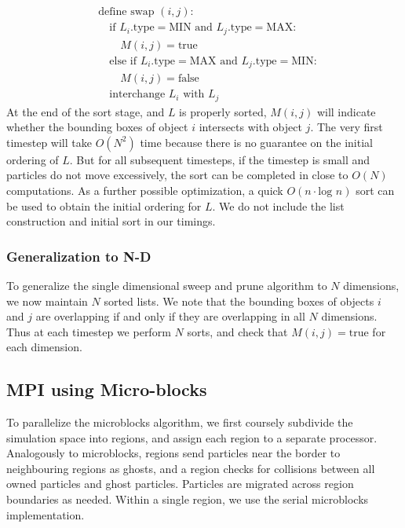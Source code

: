 \documentclass[11pt]{article} %
\begin{document}
\[
\begin{aligned} & \text{define swap }(i,j):\\
 & \quad\text{if }L_{i}\text{.type}=\text{MIN and }L_{j}\text{.type}=\text{MAX}:\\
 & \quad\quad M(i,j)=\text{true}\\
 & \quad\text{else if }L_{i}\text{.type}=\text{MAX and }L_{j}\text{.type}=\text{MIN}:\\
 & \quad\quad M(i,j)=\text{false}\\
 & \quad\text{interchange }L_{i}\text{ with }L_{j}
\end{aligned}
\]
At the end of the sort stage, and $L$ is properly sorted, $M(i,j)$
will indicate whether the bounding boxes of object $i$ intersects
with object $j$. The very first timestep will take $O(N^{2})$ time
because there is no guarantee on the initial ordering of $L$. But
for all subsequent timesteps, if the timestep is small and particles
do not move excessively, the sort can be completed in close to $O(N)$
computations. As a further possible optimization, a quick $O(n\cdot\text{log }n)$
sort can be used to obtain the initial ordering for $L$. We do not include the list construction and initial sort in our timings.

\subsubsection{Generalization to N-D}

To generalize the single dimensional sweep and prune algorithm to
$N$ dimensions, we now maintain $N$ sorted lists. We note that the
bounding boxes of objects $i$ and $j$ are overlapping if and only
if they are overlapping in all $N$ dimensions. Thus at each timestep
we perform $N$ sorts, and check that $M(i,j)=\text{true}$ for each
dimension. 

\subsection{MPI using Micro-blocks}

To parallelize the microblocks algorithm, we first coursely subdivide the simulation space into regions, and assign each region to a separate processor. Analogously to microblocks, regions send particles near the border to neighbouring regions as ghosts, and a region checks for collisions between all owned particles and ghost particles. Particles are migrated across region boundaries as needed. Within a single region, we use the serial microblocks implementation.
\end{document}
